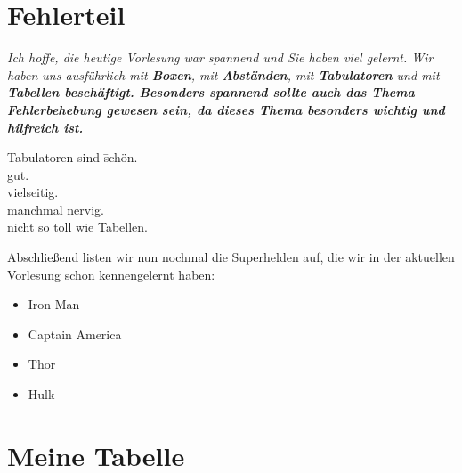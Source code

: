 \documentclass[a4paper,12pt]{scrartcl}
\begin{document}
\section{Fehlerteil}

\textit{Ich hoffe, die heutige Vorlesung war spannend und Sie haben viel gelernt.
Wir haben uns ausführlich mit \textbf{Boxen}, mit \textbf{Abständen},
mit \textbf{Tabulatoren} und mit \textbf{Tabellen beschäftigt.
Besonders spannend sollte auch das Thema Fehlerbehebung gewesen sein,
da dieses Thema besonders wichtig und hilfreich ist.}}

\begin{tabbing}
Tabulatoren sind \= schön. \\
\> gut. \\
\> vielseitig.\\
\> manchmal nervig. \\
\> nicht so toll wie Tabellen.
\end{tabbing}

\noindent Abschließend listen wir nun nochmal die Superhelden auf,
die wir in der aktuellen Vorlesung schon kennengelernt haben:
\begin{itemize}
\item Iron Man
\item Captain America
\item Thor
\item Hulk
\end{itemize}


\newpage
\section{Meine Tabelle}

\end{document}
